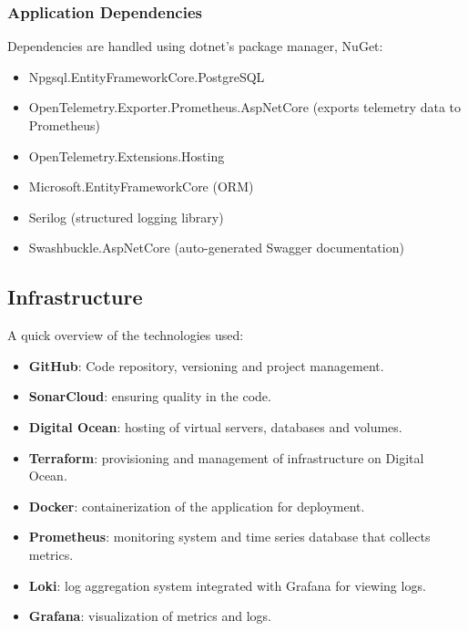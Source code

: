 \subsubsection{Application Dependencies}
Dependencies are handled using dotnet's package manager, NuGet:
\begin{itemize}
    \item Npgsql.EntityFrameworkCore.PostgreSQL 
    \item OpenTelemetry.Exporter.Prometheus.AspNetCore (exports telemetry data to Prometheus)
    \item OpenTelemetry.Extensions.Hosting
    \item Microsoft.EntityFrameworkCore (ORM)
    \item Serilog (structured logging library)
    \item Swashbuckle.AspNetCore (auto-generated Swagger documentation)
\end{itemize}

\subsection{Infrastructure}
A quick overview of the technologies used:
\begin{itemize}
    \item \textbf{GitHub}: Code repository, versioning and project management.
    \item \textbf{SonarCloud}: ensuring quality in the code.
    \item \textbf{Digital Ocean}: hosting of virtual servers, databases and volumes.
    \item \textbf{Terraform}: provisioning and management of infrastructure on Digital Ocean.
    \item \textbf{Docker}: containerization of the application for deployment.
    \item \textbf{Prometheus}: monitoring system and time series database that collects metrics.
    \item \textbf{Loki}: log aggregation system integrated with Grafana for viewing logs.
    \item \textbf{Grafana}: visualization of metrics and logs.
\end{itemize} 

